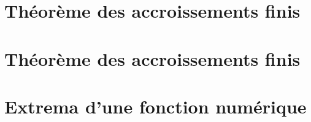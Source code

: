 \section{Théorème des accroissements finis}


\section{Théorème des accroissements finis}



\section{Extrema d'une fonction numérique}
